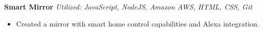 {\textbf{Smart Mirror}} {\sl Utilized: JavaScript, NodeJS, Amazon AWS, HTML, CSS, Git} \\
\begin{itemize} \itemsep 1pt
	\item Created a mirror with smart home control capabilities and Alexa integration.
\end{itemize}
\vspace*{2mm}